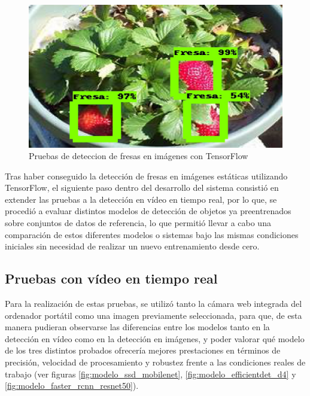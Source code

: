 \begin{figure}[H]
\begin{minipage}{0.45\textwidth}
  \end{minipage}
  \hspace{2mm}
  \begin{minipage}{0.45\textwidth}
    \centering
    \includegraphics[width=\linewidth]{figs/1000.jpeg}
  \end{minipage}
  \caption{Pruebas de deteccion de fresas en imágenes con TensorFlow}
  \label{fig:Deteccion_Fresas_Imagenes_TF}
  \end{figure}

Tras haber conseguido la detección de fresas en imágenes estáticas utilizando TensorFlow, el siguiente paso dentro del desarrollo del sistema consistió en extender las pruebas a la detección en vídeo en tiempo real, por lo que, se procedió a evaluar distintos modelos de detección de objetos ya preentrenados sobre conjuntos de datos de referencia, lo que permitió llevar a cabo una comparación de estos diferentes modelos o sistemas bajo las mismas condiciones iniciales sin necesidad de realizar un nuevo entrenamiento desde cero. 

\subsection{Pruebas con vídeo en tiempo real}
\label{sec:Pruebas_video_TF}

Para la realización de estas pruebas, se utilizó tanto la cámara web integrada del ordenador portátil como una imagen previamente seleccionada, para que, de esta manera pudieran observarse las diferencias entre los modelos tanto en la detección en vídeo como en la detección en imágenes, y poder valorar qué modelo de los tres distintos probados ofrecería mejores prestaciones en términos de precisión, velocidad de procesamiento y robustez frente a las condiciones reales de trabajo (ver figuras  \ref{fig:modelo_ssd_mobilenet}, \ref{fig:modelo_efficientdet_d4} y \ref{fig:modelo_faster_rcnn_resnet50}). 

